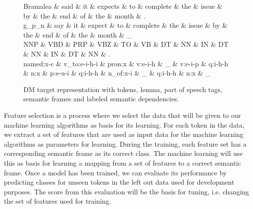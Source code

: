 \begin{figure}
    \centering
    \smaller[]
    \smaller[]
    \smaller[]
    \begin{dependency}[]
        \begin{deptext}[column sep=0.5em, row sep=.1ex]
            Bramalea \& said \& it \& expects \& to \& complete \& the \& issue \& by \& the \& end \& of \& the \& month \& . \\
            
            g\_p\_n \& say \& it \& expect \& to \& complete \& the \& issue \& by \& the \& end \& of \& the \& month \& \_ \\
            
            NNP \& VBD \& PRP \& VBZ \& TO \& VB \& DT \& NN \& IN \& DT \& NN \& IN \& DT \& NN \& . \\
            
            named:x-c \& v\_to:e-i-h-i \& pron:x \& v:e-i-h \& \_ \& v:e-i-p \& q:i-h-h \& n:x \& p:e-u-i \& q:i-h-h \& n\_of:x-i \& \_ \& q:i-h-h \& n:x \& \_ \\
        \end{deptext}
    \end{dependency}
    \caption{DM target representation with tokens, lemma, part of speech tags, semantic frames and labeled semantic dependencies.}
    \label{DM:all}
\end{figure}

Feature selection is a process where we select the data that will be given to our machine learning algorithms as basis for its learning. For each token in the data, we extract a set of features that are used as input data for the machine learning algorithms as parameters for learning. During the training, each feature set has a corresponding semantic frame as its correct class. The machine learning will use this as basis for learning a mapping from a set of features to a correct semantic frame. Once a model has been trained, we can evaluate its performance by predicting classes for unseen tokens in the left out data used for development purposes. The score from this evaluation will be the basis for tuning, i.e. changing the set of features used for training.

